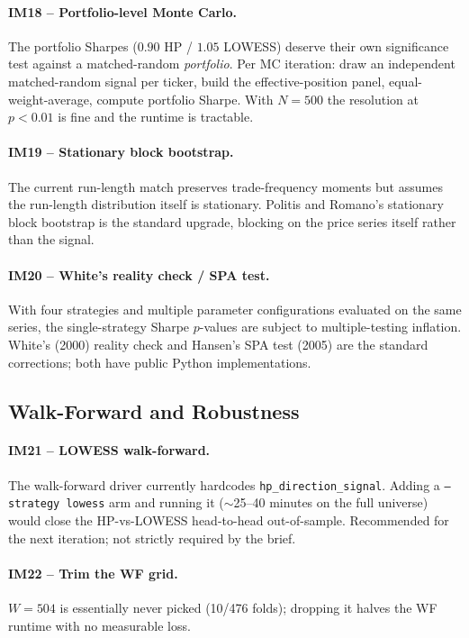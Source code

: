 \documentclass[11pt,a4paper]{article}
\begin{document}
\paragraph{IM18 -- Portfolio-level Monte Carlo.} The portfolio Sharpes
($0.90$ HP / $1.05$ LOWESS) deserve their own significance test against a
matched-random \emph{portfolio}. Per MC iteration: draw an independent
matched-random signal per ticker, build the effective-position panel,
equal-weight-average, compute portfolio Sharpe. With $N=500$ the resolution
at $p<0.01$ is fine and the runtime is tractable.

\paragraph{IM19 -- Stationary block bootstrap.} The current run-length match
preserves trade-frequency moments but assumes the run-length distribution
itself is stationary. Politis and Romano's stationary block bootstrap is the
standard upgrade, blocking on the price series itself rather than the signal.

\paragraph{IM20 -- White's reality check / SPA test.} With four strategies and
multiple parameter configurations evaluated on the same series, the
single-strategy Sharpe $p$-values are subject to multiple-testing inflation.
White's (2000) reality check and Hansen's SPA test (2005) are the standard
corrections; both have public Python implementations.

\subsection{Walk-Forward and Robustness}

\paragraph{IM21 -- LOWESS walk-forward.} The walk-forward driver currently
hardcodes \texttt{hp\_direction\_signal}. Adding a \texttt{--strategy lowess}
arm and running it ($\sim$25--40 minutes on the full universe) would close
the HP-vs-LOWESS head-to-head out-of-sample. Recommended for the next
iteration; not strictly required by the brief.

\paragraph{IM22 -- Trim the WF grid.} $W{=}504$ is essentially never picked
(10/476 folds); dropping it halves the WF runtime with no measurable loss.
\end{document}
